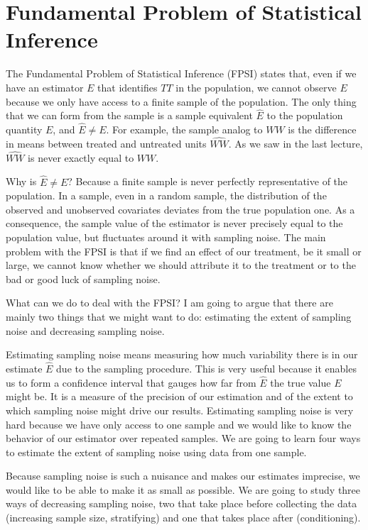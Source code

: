 \documentclass[]{book}
\theoremstyle{definition}
\theoremstyle{definition}
\theoremstyle{definition}
\theoremstyle{remark}
\begin{document}
\chapter{Fundamental Problem of Statistical Inference}\label{FPSI}

The Fundamental Problem of Statistical Inference (FPSI) states that,
even if we have an estimator \(E\) that identifies \(TT\) in the
population, we cannot observe \(E\) because we only have access to a
finite sample of the population. The only thing that we can form from
the sample is a sample equivalent \(\hat{E}\) to the population quantity
\(E\), and \(\hat{E}\neq E\). For example, the sample analog to \(WW\)
is the difference in means between treated and untreated units
\(\hat{WW}\). As we saw in the last lecture, \(\hat{WW}\) is never
exactly equal to \(WW\).

Why is \(\hat{E}\neq E\)? Because a finite sample is never perfectly
representative of the population. In a sample, even in a random sample,
the distribution of the observed and unobserved covariates deviates from
the true population one. As a consequence, the sample value of the
estimator is never precisely equal to the population value, but
fluctuates around it with sampling noise. The main problem with the FPSI
is that if we find an effect of our treatment, be it small or large, we
cannot know whether we should attribute it to the treatment or to the
bad or good luck of sampling noise.

What can we do to deal with the FPSI? I am going to argue that there are
mainly two things that we might want to do: estimating the extent of
sampling noise and decreasing sampling noise.

Estimating sampling noise means measuring how much variability there is
in our estimate \(\hat{E}\) due to the sampling procedure. This is very
useful because it enables us to form a confidence interval that gauges
how far from \(\hat{E}\) the true value \(E\) might be. It is a measure
of the precision of our estimation and of the extent to which sampling
noise might drive our results. Estimating sampling noise is very hard
because we have only access to one sample and we would like to know the
behavior of our estimator over repeated samples. We are going to learn
four ways to estimate the extent of sampling noise using data from one
sample.

Because sampling noise is such a nuisance and makes our estimates
imprecise, we would like to be able to make it as small as possible. We
are going to study three ways of decreasing sampling noise, two that
take place before collecting the data (increasing sample size,
stratifying) and one that takes place after (conditioning).
\end{document}

